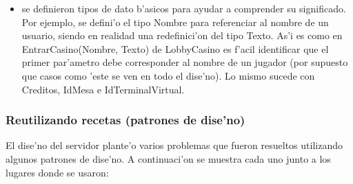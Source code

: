 \begin{itemize}
\begin{itemize}
	\end{itemize}
\item se definieron tipos de dato b'asicos para ayudar a comprender su significado. Por ejemplo, se defini'o el tipo Nombre para referenciar al nombre de un usuario, siendo en realidad una redefinici'on del tipo Texto. As'i es como en EntrarCasino(Nombre, Texto) de LobbyCasino es f'acil identificar que el primer par'ametro debe corresponder al nombre de un jugador (por supuesto que casos como 'este se ven en todo el dise'no). Lo mismo sucede con Creditos, IdMesa e IdTerminalVirtual.
\end{itemize}



\subsubsection{Reutilizando recetas  (patrones de dise'no)}
El dise'no del servidor plante'o varios problemas que fueron resueltos utilizando algunos patrones de dise'no. A continuaci'on se muestra cada uno junto a los lugares donde se usaron:

